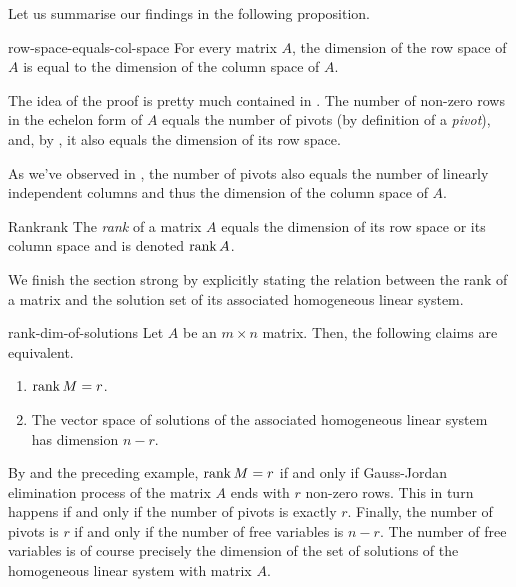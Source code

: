 Let us summarise our findings in the following proposition.

\begin{proposition}{}{row-space-equals-col-space}
 For every matrix $A$, the dimension of the row space of $A$ is equal to the
 dimension of the column space of $A$.
\end{proposition}
\begin{propproof}
 The idea of the proof is pretty much contained in
 . The number of non-zero rows in the
 echelon form of $A$ equals the number of pivots (by definition of a
 \emph{pivot}), and, by , it also equals the
 dimension of its row space.

 As we've observed in , the number of
 pivots also equals the number of linearly independent columns and thus the
 dimension of the column space of $A$.
\end{propproof}

\begin{definition}{Rank}{rank}
 The \emph{rank} of a matrix $A$ equals the dimension of its row space or its
 column space and is denoted $\operatorname{rank} A$.
\end{definition}

We finish the section strong by explicitly stating the relation between the rank
of a matrix and the solution set of its associated homogeneous linear system.

\begin{theorem}{}{rank-dim-of-solutions}
 Let $A$ be an $m \times n$ matrix. Then, the following claims are equivalent.
 \begin{enumerate}
  \item $\operatorname{rank} M = r$.
  \item The vector space of solutions of the associated homogeneous linear
   system has dimension $n - r$.
 \end{enumerate}
\end{theorem}
\begin{thmproof}
 By  and the preceding
 example, $\operatorname{rank} M = r$ if and only if Gauss-Jordan elimination process of the
 matrix $A$ ends with $r$ non-zero rows. This in turn happens if and only if the
 number of pivots is exactly $r$. Finally, the number of pivots is $r$ if and
 only if the number of free variables is $n - r$. The number of free variables
 is of course precisely the dimension of the set of solutions of the homogeneous
 linear system with matrix $A$.
\end{thmproof}

